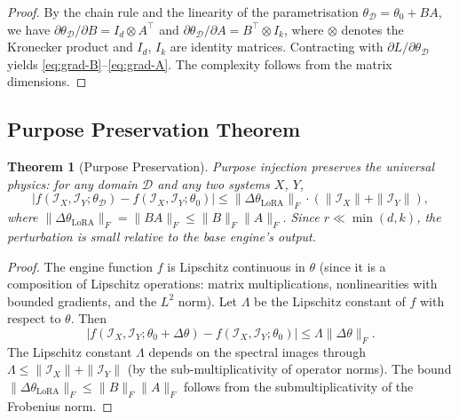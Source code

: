 \documentclass[11pt,twocolumn,a4paper]{article}
\newtheorem{theorem}{Theorem}[section]
\theoremstyle{definition}
\theoremstyle{remark}
\newcommand{\LoRA}{\mathrm{LoRA}}
\begin{document}
\begin{proof}
By the chain rule and the linearity of the parametrisation $\theta_{\mathcal{D}} = \theta_0 + BA$, we have $\partial\theta_{\mathcal{D}}/\partial B = I_d \otimes A^\top$ and $\partial\theta_{\mathcal{D}}/\partial A = B^\top \otimes I_k$, where $\otimes$ denotes the Kronecker product and $I_d$, $I_k$ are identity matrices.  Contracting with $\partial L/\partial\theta_{\mathcal{D}}$ yields \eqref{eq:grad-B}--\eqref{eq:grad-A}.  The complexity follows from the matrix dimensions.
\end{proof}

\subsection{Purpose Preservation Theorem}

\begin{theorem}[Purpose Preservation]\label{thm:purpose-preservation}
Purpose injection preserves the universal physics: for any domain $\mathcal{D}$ and any two systems $X$, $Y$,
\begin{equation}\label{eq:purpose-preservation}
    \left| f(\mathcal{I}_X, \mathcal{I}_Y; \theta_{\mathcal{D}}) - f(\mathcal{I}_X, \mathcal{I}_Y; \theta_0) \right| \leq \|\Delta\theta_{\LoRA}\|_F \cdot \left(\|\mathcal{I}_X\| + \|\mathcal{I}_Y\|\right),
\end{equation}
where $\|\Delta\theta_{\LoRA}\|_F = \|BA\|_F \leq \|B\|_F \|A\|_F$.  Since $r \ll \min(d,k)$, the perturbation is small relative to the base engine's output.
\end{theorem}

\begin{proof}
The engine function $f$ is Lipschitz continuous in $\theta$ (since it is a composition of Lipschitz operations: matrix multiplications, nonlinearities with bounded gradients, and the $L^2$ norm).  Let $\Lambda$ be the Lipschitz constant of $f$ with respect to $\theta$.  Then
\begin{equation}
    |f(\mathcal{I}_X, \mathcal{I}_Y; \theta_0 + \Delta\theta) - f(\mathcal{I}_X, \mathcal{I}_Y; \theta_0)| \leq \Lambda \|\Delta\theta\|_F.
\end{equation}
The Lipschitz constant $\Lambda$ depends on the spectral images through $\Lambda \leq \|\mathcal{I}_X\| + \|\mathcal{I}_Y\|$ (by the sub-multiplicativity of operator norms).  The bound $\|\Delta\theta_{\LoRA}\|_F \leq \|B\|_F\|A\|_F$ follows from the submultiplicativity of the Frobenius norm.
\end{proof}
\end{document}
